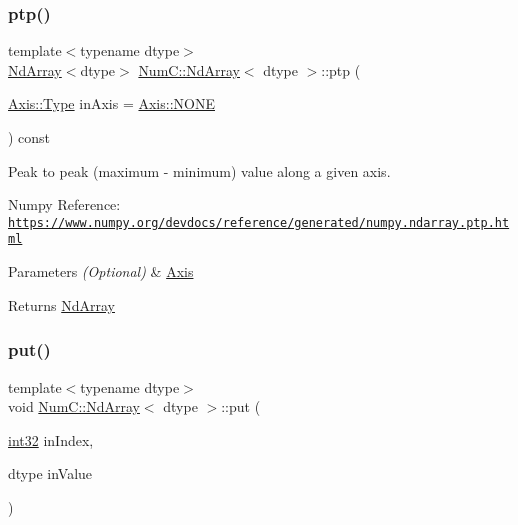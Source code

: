 \subsubsection{\texorpdfstring{ptp()}{ptp()}}
{\footnotesize\ttfamily template$<$typename dtype$>$ \\
\mbox{\hyperlink{class_num_c_1_1_nd_array}{Nd\+Array}}$<$dtype$>$ \mbox{\hyperlink{class_num_c_1_1_nd_array}{Num\+C\+::\+Nd\+Array}}$<$ dtype $>$\+::ptp (\begin{DoxyParamCaption}\item[{\mbox{\hyperlink{struct_num_c_1_1_axis_a8e689044ef1941a03482e730c5e7ebb3}{Axis\+::\+Type}}}]{in\+Axis = {\ttfamily \mbox{\hyperlink{struct_num_c_1_1_axis_a8e689044ef1941a03482e730c5e7ebb3a0ae033c4226f7184bf0050b101e7ed94}{Axis\+::\+N\+O\+NE}}} }\end{DoxyParamCaption}) const\hspace{0.3cm}{\ttfamily [inline]}}

Peak to peak (maximum -\/ minimum) value along a given axis.

Numpy Reference\+: \href{https://www.numpy.org/devdocs/reference/generated/numpy.ndarray.ptp.html}{\tt https\+://www.\+numpy.\+org/devdocs/reference/generated/numpy.\+ndarray.\+ptp.\+html}


\begin{DoxyParams}{Parameters}
{\em (\+Optional)} & \mbox{\hyperlink{struct_num_c_1_1_axis}{Axis}} \\
\hline
\end{DoxyParams}
\begin{DoxyReturn}{Returns}
\mbox{\hyperlink{class_num_c_1_1_nd_array}{Nd\+Array}} 
\end{DoxyReturn}
\mbox{\label{class_num_c_1_1_nd_array_ac1f5bf7ebbf9b9941e07a72371bf521b}} 
\subsubsection{\texorpdfstring{put()}{put()}\hspace{0.1cm}{\footnotesize\ttfamily [1/12]}}
{\footnotesize\ttfamily template$<$typename dtype$>$ \\
void \mbox{\hyperlink{class_num_c_1_1_nd_array}{Num\+C\+::\+Nd\+Array}}$<$ dtype $>$\+::put (\begin{DoxyParamCaption}\item[{\mbox{\hyperlink{namespace_num_c_aa5a7e69266097d55816d4cdb19542b53}{int32}}}]{in\+Index,  }\item[{dtype}]{in\+Value }\end{DoxyParamCaption})\hspace{0.3cm}{\ttfamily [inline]}}

